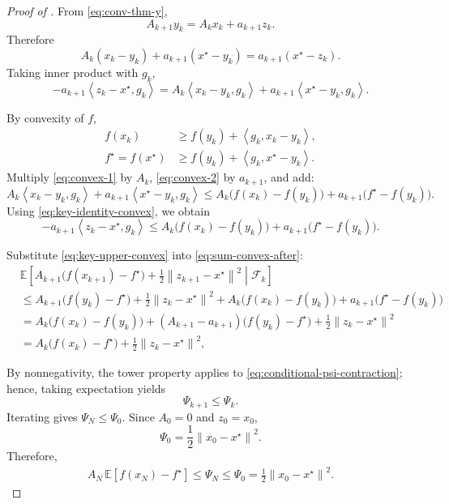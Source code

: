 \documentclass[10pt]{article}
\newcommand{\E}{\mathbb{E}}
\newcommand{\F}{\mathcal{F}}
\newcommand{\ip}[2]{\left\langle #1,#2\right\rangle}
\newcommand{\norm}[1]{\left\|#1\right\|}
\begin{document}
\begin{proof}[Proof of ]
From \eqref{eq:conv-thm-y},
\[
A_{k+1}y_k = A_k x_k + a_{k+1} z_k.
\]
Therefore
\[
A_k(x_k-y_k)+a_{k+1}(x^\star-y_k)=a_{k+1}(x^\star-z_k).
\]
Taking inner product with \(g_k\),
\begin{equation}
-a_{k+1}\ip{z_k-x^\star}{g_k}
=
A_k\ip{x_k-y_k}{g_k}+a_{k+1}\ip{x^\star-y_k}{g_k}.
\label{eq:key-identity-convex}
\end{equation}

By convexity of \(f\),
\begin{align}
f(x_k) &\ge f(y_k)+\ip{g_k}{x_k-y_k},
\label{eq:convex-1}\\
f^\star=f(x^\star) &\ge f(y_k)+\ip{g_k}{x^\star-y_k}.
\label{eq:convex-2}
\end{align}
Multiply \eqref{eq:convex-1} by \(A_k\), \eqref{eq:convex-2} by \(a_{k+1}\), and add:
\[
A_k\ip{x_k-y_k}{g_k}+a_{k+1}\ip{x^\star-y_k}{g_k}
\le
A_k\bigl(f(x_k)-f(y_k)\bigr)+a_{k+1}\bigl(f^\star-f(y_k)\bigr).
\]
Using \eqref{eq:key-identity-convex}, we obtain
\begin{equation}
-a_{k+1}\ip{z_k-x^\star}{g_k}
\le
A_k\bigl(f(x_k)-f(y_k)\bigr)+a_{k+1}\bigl(f^\star-f(y_k)\bigr).
\label{eq:key-upper-convex}
\end{equation}

Substitute \eqref{eq:key-upper-convex} into \eqref{eq:sum-convex-after}:
\begin{align}
&\E\!\left[
A_{k+1}\bigl(f(x_{k+1})-f^\star\bigr)+\frac12 \norm{z_{k+1}-x^\star}^2
\middle| \F_k\right]
\nonumber\\
&\le
A_{k+1}\bigl(f(y_k)-f^\star\bigr)
+\frac12 \norm{z_k-x^\star}^2
+A_k\bigl(f(x_k)-f(y_k)\bigr)+a_{k+1}\bigl(f^\star-f(y_k)\bigr)
\nonumber\\
&=
A_k\bigl(f(x_k)-f(y_k)\bigr)
+(A_{k+1}-a_{k+1})\bigl(f(y_k)-f^\star\bigr)
+\frac12 \norm{z_k-x^\star}^2
\nonumber\\
&=
A_k\bigl(f(x_k)-f^\star\bigr)+\frac12 \norm{z_k-x^\star}^2,
\label{eq:conditional-psi-contraction}
\end{align}

By nonnegativity, the tower property applies to
\eqref{eq:conditional-psi-contraction}; hence, taking expectation yields
\[
\Psi_{k+1}\le \Psi_k.
\]
Iterating gives \(\Psi_N\le\Psi_0\). Since \(A_0=0\) and \(z_0=x_0\),
\[
\Psi_0=\frac12\norm{x_0-x^\star}^2.
\]
Therefore,
\begin{align}
\label{eq:AN-bound-convex}
A_N\,\E[f(x_N)-f^\star]
\le
\Psi_N
\le
\Psi_0
=
\frac12 \norm{x_0-x^\star}^2.
\end{align}


\end{proof}
\end{document}
